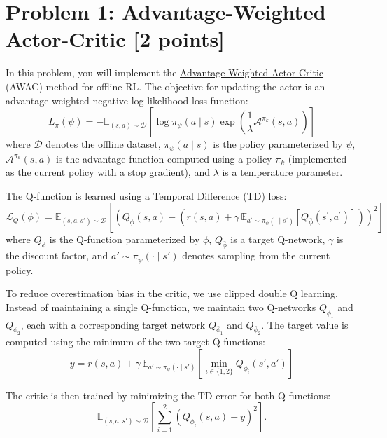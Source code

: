 \documentclass[12pt]{article}
\begin{document}
\newpage

\section*{Problem 1: Advantage-Weighted Actor-Critic [2 points]}
In this problem, you will implement the \href{https://arxiv.org/abs/2006.09359}{Advantage-Weighted Actor-Critic} (AWAC) method for offline RL. The objective for updating the actor is an advantage-weighted negative log-likelihood loss function: 
\begin{equation}
\label{eq:awac_actor}
L_\pi(\psi)=-\mathbb{E}_{(s, a) \sim \mathcal{D}}\left[\log \pi_\psi(a \mid s) \exp \left(\frac{1}{\lambda} \mathcal{A}^{\pi_k}(s, a)\right)\right]
\end{equation}
where $\mathcal{D}$ denotes the offline dataset, $\pi_\psi(a \mid s)$ is the policy parameterized by $\psi$, $\mathcal{A}^{\pi_k}(s,a)$ is the advantage function computed using a  policy $\pi_k$ (implemented as the current policy with a stop gradient), and $\lambda$ is a temperature parameter.

The Q-function is learned using a Temporal Difference (TD) loss:
\begin{equation}
\label{eq:td_objective}
\mathcal{L}_Q(\phi) =
\mathbb{E}_{(s,a,s') \sim \mathcal{D}}
\left[\left(Q_{\phi}(s, a) -
\left( r(s, a) + \gamma \, \mathbb{E}_{a^{\prime} \sim \pi_\psi(\cdot \mid s^{\prime})}
\left[Q_{\bar{\phi}}\left(s^{\prime}, a^{\prime}\right)\right]
\right)\right)^2\right]
\end{equation}
where $Q_\phi$ is the Q-function parameterized by $\phi$, $Q_{\bar{\phi}}$ is a target Q-network, $\gamma$ is the discount factor, and $a' \sim \pi_\psi(\cdot \mid s')$ denotes sampling from the current policy.

To reduce overestimation bias in the critic, we use clipped double Q learning. Instead of maintaining a single Q-function, we maintain two Q-networks $Q_{\phi_1}$ and $Q_{\phi_2}$, each with a corresponding target network $Q_{\bar{\phi}_1}$ and $Q_{\bar{\phi}_2}$. The target value is computed using the minimum of the two target Q-functions:
\begin{equation}
    y = r(s, a) + \gamma \, \mathbb{E}_{a' \sim \pi_\psi(\cdot \mid s')} \left[ \min_{i \in \{1,2\}} Q_{\bar{\phi}_i}(s', a') \right]
\end{equation}

The critic is then trained by minimizing the TD error for both Q-functions:
\begin{equation}
    \mathbb{E}_{(s,a,s') \sim \mathcal{D}} \left[ \sum_{i=1}^2 \left( Q_{\phi_i}(s, a) - y \right)^2 \right].
\end{equation}
\end{document}
